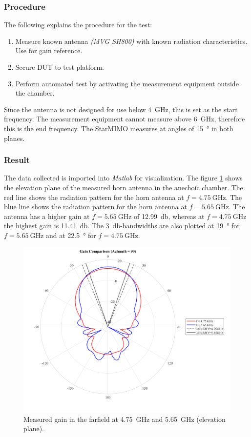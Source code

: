\subsubsection{Procedure}
The following explains the procedure for the test:
\begin{enumerate}
    \item Measure known antenna \textit{(MVG SH800)} with known radiation characteristics. Use for gain reference.
    \item Secure DUT to test platform.
    \item Perform automated test by activating the measurement equipment outside the chamber.
\end{enumerate}
Since the antenna is not designed for use below \SI{4}{\giga\hertz}, this is set as the start frequency. The measurement equipment cannot measure above \SI{6}{\giga\hertz}, therefore this is the end frequency. The StarMIMO measures at angles of \SI{15}{\degree} in both planes.

\subsubsection{Result}
The data collected is imported into \textit{Matlab} for visualization. The figure \ref{fig:horn_elevation} shows the elevation plane of the measured horn antenna in the anechoic chamber. The red line shows the radiation pattern for the horn antenna at $f=\SI{4.75}{\giga\hertz}$. The blue line shows the radiation pattern for the horn antenna at $f=\SI{5.65}{\giga\hertz}$. The antenna has a higher gain at $f=\SI{5.65}{\giga\hertz}$ of \SI{12.99}{\decibel}, whereas at $f=\SI{4.75}{\giga\hertz}$ the highest gain is \SI{11.41}{\decibel}. The \SI{3}{\decibel}-bandwidths are also plotted at \SI{19}{\degree} for $f=\SI{5.65}{\giga\hertz}$ and at \SI{22.5}{\degree} for $f=\SI{4.75}{\giga\hertz}$.
\begin{figure}[H]
    \centering
    \includegraphics[width=1\textwidth]{figures/horn_elevation.png}
    \caption{Measured gain in the farfield at \SI{4.75}{\giga\hertz} and \SI{5.65}{\giga\hertz} (elevation plane).} 
    \label{fig:horn_elevation}
\end{figure}

